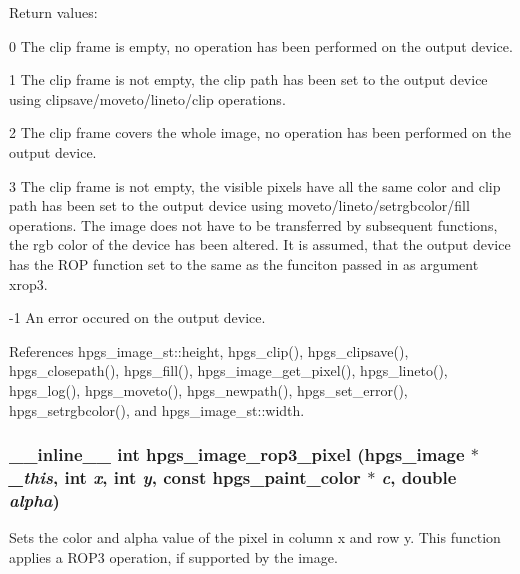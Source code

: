 Return values: \begin{DoxyItemize}
\item 0 The clip frame is empty, no operation has been performed on the output device.\end{DoxyItemize}
\begin{DoxyItemize}
\item 1 The clip frame is not empty, the clip path has been set to the output device using clipsave/moveto/lineto/clip operations.\end{DoxyItemize}
\begin{DoxyItemize}
\item 2 The clip frame covers the whole image, no operation has been performed on the output device.\end{DoxyItemize}
\begin{DoxyItemize}
\item 3 The clip frame is not empty, the visible pixels have all the same color and clip path has been set to the output device using moveto/lineto/setrgbcolor/fill operations. The image does not have to be transferred by subsequent functions, the rgb color of the device has been altered. It is assumed, that the output device has the ROP function set to the same as the funciton passed in as argument {\ttfamily xrop3}.\end{DoxyItemize}
\begin{DoxyItemize}
\item -\/1 An error occured on the output device. \end{DoxyItemize}


References hpgs\_\-image\_\-st::height, hpgs\_\-clip(), hpgs\_\-clipsave(), hpgs\_\-closepath(), hpgs\_\-fill(), hpgs\_\-image\_\-get\_\-pixel(), hpgs\_\-lineto(), hpgs\_\-log(), hpgs\_\-moveto(), hpgs\_\-newpath(), hpgs\_\-set\_\-error(), hpgs\_\-setrgbcolor(), and hpgs\_\-image\_\-st::width.

\subsubsection[{hpgs\_\-image\_\-rop3\_\-pixel}]{\setlength{\rightskip}{0pt plus 5cm}\_\-\_\-inline\_\-\_\- int hpgs\_\-image\_\-rop3\_\-pixel ({\bf hpgs\_\-image} $\ast$ {\em \_\-this}, \/  int {\em x}, \/  int {\em y}, \/  const {\bf hpgs\_\-paint\_\-color} $\ast$ {\em c}, \/  double {\em alpha})\hspace{0.3cm}{\ttfamily  [static]}}\label{group__image_ga62487d780b695de88ea0c944fef61894}
Sets the color and alpha value of the pixel in column {\ttfamily x} and row {\ttfamily y}. This function applies a ROP3 operation, if supported by the image. 


